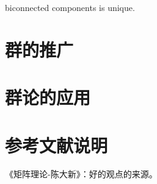 \documentclass[UTF8]{../../09-Mathematics}
\begin{document}
biconnected components is unique. %



\chapter{群的推广}
\chapter{群论的应用}






\chapter{参考文献说明}
《矩阵理论-陈大新》：好的观点的来源。


\end{document}
